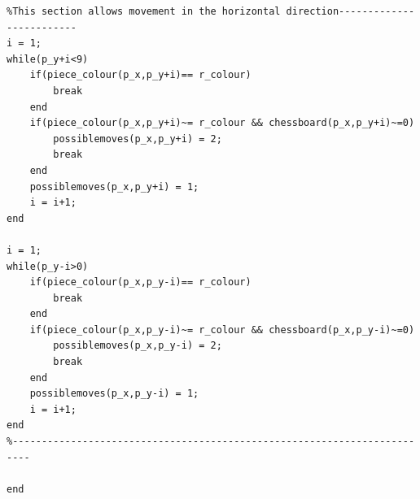 \documentclass[11pt,a4paper]{article}
\begin{document}
\begin{lstlisting}
%This section allows movement in the horizontal direction-------------------------
i = 1;
while(p_y+i<9)
    if(piece_colour(p_x,p_y+i)== r_colour)
        break
    end
    if(piece_colour(p_x,p_y+i)~= r_colour && chessboard(p_x,p_y+i)~=0)
        possiblemoves(p_x,p_y+i) = 2;
        break
    end
    possiblemoves(p_x,p_y+i) = 1;
    i = i+1;
end

i = 1;
while(p_y-i>0)
    if(piece_colour(p_x,p_y-i)== r_colour)
        break
    end
    if(piece_colour(p_x,p_y-i)~= r_colour && chessboard(p_x,p_y-i)~=0)
        possiblemoves(p_x,p_y-i) = 2;
        break
    end
    possiblemoves(p_x,p_y-i) = 1;
    i = i+1;
end
%-------------------------------------------------------------------------

end
\end{lstlisting}
\end{document}
